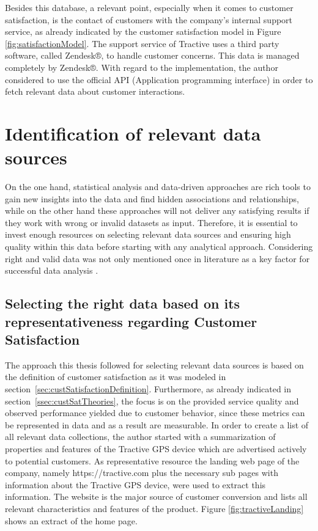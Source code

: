 Besides this database, a relevant point, especially when it comes to customer satisfaction, is the contact of customers with the company's internal support service, as already indicated by the customer satisfaction model in Figure \ref{fig:satisfactionModel}. The support service of Tractive uses a third party software, called Zendesk®, to handle customer concerns. This data is managed completely by Zendesk®. With regard to the implementation, the author considered to use the official API (Application programming interface) in order to fetch relevant data about customer interactions. 

\section{Identification of relevant data sources}
\label{sec:dataSources}
On the one hand, statistical analysis and data-driven approaches are rich tools to gain new insights into the data and find hidden associations and relationships, while on the other hand these approaches will not deliver any satisfying results if they work with wrong or invalid datasets as input. Therefore, it is essential to invest enough resources on selecting relevant data sources and ensuring high quality within this data before starting with any analytical approach. Considering right and valid data was not only mentioned once in literature as a key factor for successful data analysis \cite{neckel2015}. 

\subsection{Selecting the right data based on its representativeness regarding Customer Satisfaction}
The approach this thesis followed for selecting relevant data sources is based on the definition of customer satisfaction as it was modeled in section~\ref{sec:custSatisfactionDefinition}. Furthermore, as already indicated in section~\ref{ssec:custSatTheories}, the focus is on the provided service quality and observed performance yielded due to customer behavior, since these metrics can be represented in data and as a result are measurable. In order to create a list of all relevant data collections, the author started with a summarization of properties and features of the Tractive GPS device which are advertised actively to potential customers. As representative resource the landing web page of the company, namely https://tractive.com plus the necessary sub pages with information about the Tractive GPS device, were used to extract this information. The website is the major source of customer conversion and lists all relevant characteristics and features of the product. Figure \ref{fig:tractiveLanding} shows an extract of the home page.

